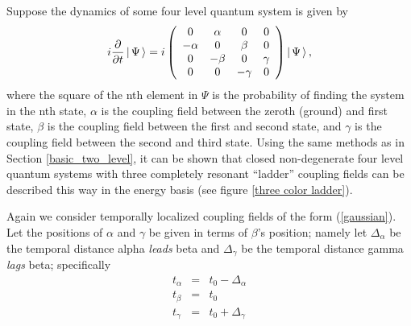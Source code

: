 Suppose the dynamics of some four level quantum system is given by
\begin{equation}
i\frac{\partial}{\partial t} \left| \hspace{0.15em} \Psi \hspace{0.15em}\right\rangle
=
i\left(
\begin{array}{cccc}
0 & \alpha & 0 & 0 \\
-\alpha & 0 & \beta & 0 \\
0 & -\beta & 0 & \gamma \\
0 & 0 & -\gamma & 0 
\end{array}
\right)
\left| \hspace{0.15em} \Psi \hspace{0.15em}\right\rangle,
\label{three dynamics}
\end{equation}
where the square of the nth element in $\Psi$ is the probability of finding the system in the nth state, $\alpha$ is the coupling field between the zeroth (ground) and first state, $\beta$ is the coupling field between the first and second state, and $\gamma$ is the coupling field between the second and third state. Using the same methods as in Section \ref{basic_two_level}, it can be shown that closed non-degenerate four level quantum systems with three completely resonant ``ladder'' coupling fields can be described this way in the energy basis (see figure \ref{three color ladder}).

Again we consider temporally localized coupling fields of the form (\ref{gaussian}). Let the positions of $\alpha$ and $\gamma$ be given in terms of $\beta$'s position; namely let $\Delta_\alpha$ be the temporal distance alpha \emph{leads} beta and $\Delta_\gamma$ be the temporal distance gamma \emph{lags} beta; specifically
\begin{subequations}
\begin{eqnarray} 
t_\alpha & = & t_0 - \Delta_\alpha \\
t_\beta  & = & t_0 \\
t_\gamma  & = & t_0 + \Delta_\gamma
\end{eqnarray}
\label{xxx}
\end{subequations}
